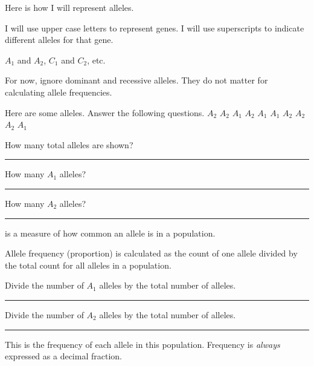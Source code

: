 \documentclass[t]{beamer}
\begin{document}
\begin{frame}[t]{Here is how I will represent alleles.}

	\hangpara  I will use upper case letters to represent genes. I will use superscripts to indicate different alleles for that gene. 
		
	\hangpara $A_1$ and $A_2$, $C_1$ and $C_2$, etc.
	
	\hangpara For now, ignore dominant and recessive alleles. They do not matter for calculating allele frequencies.
%	
%	
%	
%	
%	
\end{frame}
%
\begin{frame}{Here are some alleles. Answer the following questions.}
	\hfil $A_2$ \quad $A_2$ \quad $A_1$ \quad $A_2$ \quad $A_1$ \quad $A_1$ \quad $A_2$ \quad $A_2$ \quad $A_2$ \quad $A_1$ \hfil
	
	\vspace*{2\baselineskip}
		
	\hangpara How many total alleles are shown? \rule{0.5in}{0.4pt}
	
	\hangpara How many $A_1$ alleles? \rule{0.5in}{0.4pt}
	
	\hangpara How many $A_2$ alleles? \rule{0.5in}{0.4pt}
	
\end{frame}
%
\begin{frame}[t]{ is a measure of how common an allele is in a population.}
	
	
	\hangpara Allele frequency (proportion) is calculated as the count of one allele divided by the total count for all alleles in a population.
	
	\hangpara Divide the number of $A_1$ alleles by the total number of alleles. \rule{0.5in}{0.4pt}
	
	\hangpara Divide the number of $A_2$ alleles by the total number of alleles. \rule{0.5in}{0.4pt}
	
	\hangpara This is the frequency of each allele in this population. Frequency is \emph{always} expressed as a decimal fraction.
	 
\end{frame}
\end{document}
